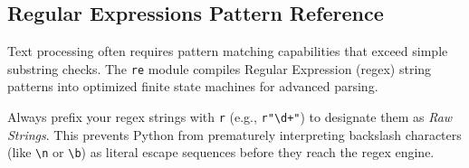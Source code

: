 \subsection{Regular Expressions Pattern Reference}

Text processing often requires pattern matching capabilities that exceed simple substring checks. The \texttt{re} module compiles Regular Expression (regex) string patterns into optimized finite state machines for advanced parsing.

Always prefix your regex strings with \texttt{r} (e.g., \texttt{r"\textbackslash d+"}) to designate them as \textit{Raw Strings}. This prevents Python from prematurely interpreting backslash characters (like \texttt{\textbackslash n} or \texttt{\textbackslash b}) as literal escape sequences before they reach the regex engine. \lpuBadge

